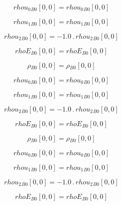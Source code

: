 \documentclass{article}
\begin{document}
\begin{dmath}{rhou_{0}{_{B0}}}[{0,0}] = {rhou_{0}{_{B0}}}[{0,0}]\end{dmath}

\begin{dmath}{rhou_{1}{_{B0}}}[{0,0}] = {rhou_{1}{_{B0}}}[{0,0}]\end{dmath}

\begin{dmath}{rhou_{2}{_{B0}}}[{0,0}] = - 1.0 \,.\, {rhou_{2}{_{B0}}}[{0,0}]\end{dmath}

\begin{dmath}{rhoE{_{B0}}}[{0,0}] = {rhoE{_{B0}}}[{0,0}]\end{dmath}

\begin{dmath}{\rho{_{B0}}}[{0,0}] = {\rho{_{B0}}}[{0,0}]\end{dmath}

\begin{dmath}{rhou_{0}{_{B0}}}[{0,0}] = {rhou_{0}{_{B0}}}[{0,0}]\end{dmath}

\begin{dmath}{rhou_{1}{_{B0}}}[{0,0}] = {rhou_{1}{_{B0}}}[{0,0}]\end{dmath}

\begin{dmath}{rhou_{2}{_{B0}}}[{0,0}] = - 1.0 \,.\, {rhou_{2}{_{B0}}}[{0,0}]\end{dmath}

\begin{dmath}{rhoE{_{B0}}}[{0,0}] = {rhoE{_{B0}}}[{0,0}]\end{dmath}

\begin{dmath}{\rho{_{B0}}}[{0,0}] = {\rho{_{B0}}}[{0,0}]\end{dmath}

\begin{dmath}{rhou_{0}{_{B0}}}[{0,0}] = {rhou_{0}{_{B0}}}[{0,0}]\end{dmath}

\begin{dmath}{rhou_{1}{_{B0}}}[{0,0}] = {rhou_{1}{_{B0}}}[{0,0}]\end{dmath}

\begin{dmath}{rhou_{2}{_{B0}}}[{0,0}] = - 1.0 \,.\, {rhou_{2}{_{B0}}}[{0,0}]\end{dmath}

\begin{dmath}{rhoE{_{B0}}}[{0,0}] = {rhoE{_{B0}}}[{0,0}]\end{dmath}
\end{document}
